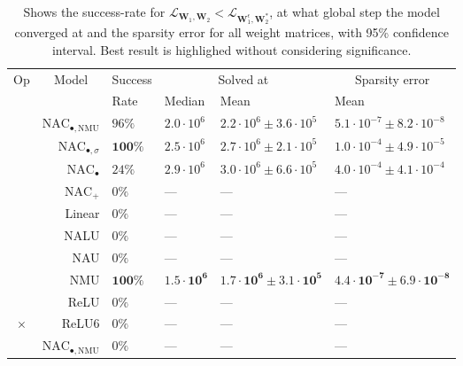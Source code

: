 \begin{table}[!h]

\caption{\label{tab:function-task-static-defaults-all}Shows the success-rate for $\mathcal{L}_{\mathbf{W}_1, \mathbf{W}_2} < \mathcal{L}_{\mathbf{W}_1^\epsilon, \mathbf{W}_2^*}$, at what global step the model converged at and the sparsity error for all weight matrices, with 95\% confidence interval. Best result is highlighed without considering significance.}
\centering
\begin{tabular}{crllll}
\toprule
\multicolumn{1}{c}{Op} & \multicolumn{1}{c}{Model} & \multicolumn{1}{c}{Success} & \multicolumn{2}{c}{Solved at} & \multicolumn{1}{c}{Sparsity error} \\
\cmidrule(l{3pt}r{3pt}){1-1} \cmidrule(l{3pt}r{3pt}){2-2} \cmidrule(l{3pt}r{3pt}){3-3} \cmidrule(l{3pt}r{3pt}){4-5} \cmidrule(l{3pt}r{3pt}){6-6}
 &  & Rate & Median & Mean & Mean\\
\midrule
 & $\mathrm{NAC}_{\bullet,\mathrm{NMU}}$ & $96\%$ & $2.0 \cdot 10^{6}$ & $2.2 \cdot 10^{6} \pm 3.6 \cdot 10^{5}$ & $5.1 \cdot 10^{-7} \pm 8.2 \cdot 10^{-8}$\\

 & $\mathrm{NAC}_{\bullet,\sigma}$ & $\mathbf{100\%}$ & $2.5 \cdot 10^{6}$ & $2.7 \cdot 10^{6} \pm 2.1 \cdot 10^{5}$ & $1.0 \cdot 10^{-4} \pm 4.9 \cdot 10^{-5}$\\

 & $\mathrm{NAC}_{\bullet}$ & $24\%$ & $2.9 \cdot 10^{6}$ & $3.0 \cdot 10^{6} \pm 6.6 \cdot 10^{5}$ & $4.0 \cdot 10^{-4} \pm 4.1 \cdot 10^{-4}$\\

 & $\mathrm{NAC}_{+}$ & $0\%$ & --- & --- & ---\\

 & Linear & $0\%$ & --- & --- & ---\\

 & NALU & $0\%$ & --- & --- & ---\\

 & NAU & $0\%$ & --- & --- & ---\\

 & NMU & $\mathbf{100\%}$ & $\mathbf{1.5 \cdot 10^{6}}$ & $\mathbf{1.7 \cdot 10^{6} \pm 3.1 \cdot 10^{5}}$ & $\mathbf{4.4 \cdot 10^{-7} \pm 6.9 \cdot 10^{-8}}$\\

 & ReLU & $0\%$ & --- & --- & ---\\

\multirow{-10}{*}{\centering\arraybackslash $\bm{\times}$} & ReLU6 & $0\%$ & --- & --- & ---\\
\cmidrule{1-6}
 & $\mathrm{NAC}_{\bullet,\mathrm{NMU}}$ & $0\%$ & --- & --- & ---\\


\end{tabular}
\end{table}

